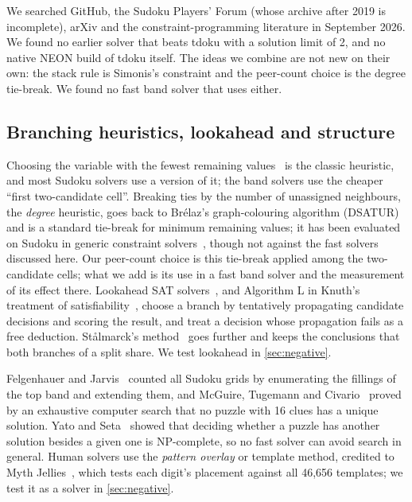 \documentclass[11pt]{article}
\theoremstyle{definition}
\theoremstyle{plain}
\begin{document}
We searched GitHub, the Sudoku Players' Forum (whose archive after 2019 is incomplete), arXiv and the
constraint-programming literature in September 2026. We found no earlier solver that beats tdoku with a solution limit
of 2, and no native NEON build of tdoku itself. The ideas we combine are not new on their own: the stack rule is
Simonis's constraint and the peer-count choice is the degree tie-break. We found no fast band solver that uses either.

\subsection{Branching heuristics, lookahead and structure}

Choosing the variable with the fewest remaining values~\cite{haralick1980increasing} is the classic heuristic, and
most Sudoku solvers use a version of it; the band solvers use the cheaper ``first two-candidate cell''. Breaking ties
by the number of unassigned neighbours, the \emph{degree} heuristic, goes back to Br\'elaz's graph-colouring algorithm
(DSATUR)~\cite{brelaz1979new} and is a standard tie-break for minimum remaining values; it has been evaluated on Sudoku in generic
constraint solvers~\cite{bakker2015generic,liu2026dibs}, though not against the fast solvers discussed here. Our peer-count choice is this
tie-break applied among the two-candidate cells; what we add is its use in a fast band solver and the measurement of
its effect there. Lookahead
SAT solvers~\cite{heule2009lookahead}, and Algorithm L in Knuth's treatment of satisfiability~\cite{knuth2022taocp4b},
choose a branch by tentatively propagating candidate decisions and scoring the result, and treat a decision whose
propagation fails as a free deduction. St\aa lmarck's method~\cite{sheeran2000tutorial} goes further and keeps the
conclusions that both branches of a split share. We test lookahead in \cref{sec:negative}.

Felgenhauer and Jarvis~\cite{felgenhauer2006mathematics} counted all Sudoku grids by enumerating the fillings of the
top band and extending them, and McGuire, Tugemann and Civario~\cite{mcguire2014sixteen} proved by an exhaustive computer search that no puzzle with 16 clues has a unique solution. Yato and
Seta~\cite{yato2003complexity} showed that deciding whether a puzzle has another solution besides a given one is
NP-complete, so no fast solver can avoid search in general. Human solvers use the \emph{pattern overlay} or template
method, credited to Myth Jellies~\cite{stuart2008pom}, which tests each digit's placement against all 46{,}656
templates; we test it as a solver in \cref{sec:negative}.
\end{document}
